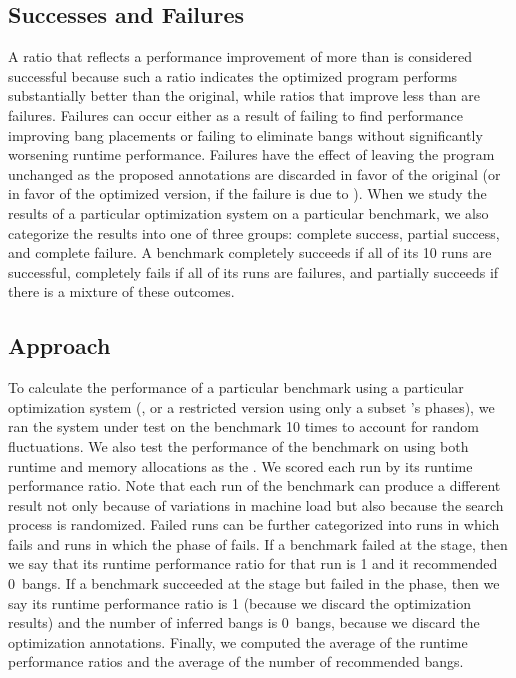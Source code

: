 \subsection{Successes and Failures}
A ratio that reflects a performance improvement of more than \absim{}
is considered successful because such a ratio indicates the
optimized program performs substantially better than the original, 
while ratios that improve less than \absim{} are failures. 
Failures can occur either as a result of \Ao{} failing to find 
performance improving bang placements or \At{} failing to eliminate 
bangs without significantly worsening runtime performance. 
Failures have the effect of leaving the program
unchanged as the proposed annotations are discarded in favor of the
original (or in favor of the \Ao{} optimized version, if the failure is due to \At{}).
When we study the results of a particular optimization system on a
particular benchmark, we also categorize the results into one of three
groups: complete success, partial success, and complete failure.  A
benchmark completely succeeds if all of its 10 runs are successful,
completely fails if all of its runs are failures, and partially
succeeds if there is a mixture of these outcomes.

\subsection{Approach}
To calculate the performance of a particular benchmark using a
particular optimization system (\eg{}, \At{} or a
restricted version using only a subset \At's phases), we ran the system under test on the benchmark 10
times to account for random fluctuations. We also test the performance of the benchmark on \At{} using both runtime and memory allocations as the \profm{}. We scored each run by its runtime performance
ratio. Note that each run of the benchmark can produce a different
result not only because of variations in machine load but also
because the search process is randomized.  Failed runs can be further
categorized into runs in which \Ao{} fails and runs in which
the \postopt{} phase of \At{}
fails. If a benchmark failed at the \Ao{} stage, then we say that its
runtime performance ratio for that run is 1 and it recommended
0~bangs. If a benchmark succeeded at the \Ao{} stage but failed
in the \postopt{} phase, then we say its runtime performance ratio is
1 (because we discard the optimization results) and the
number of inferred bangs is 0~bangs, because we discard the optimization annotations.  
Finally, we computed the average of the runtime
performance ratios and the average of the number of
recommended bangs.

